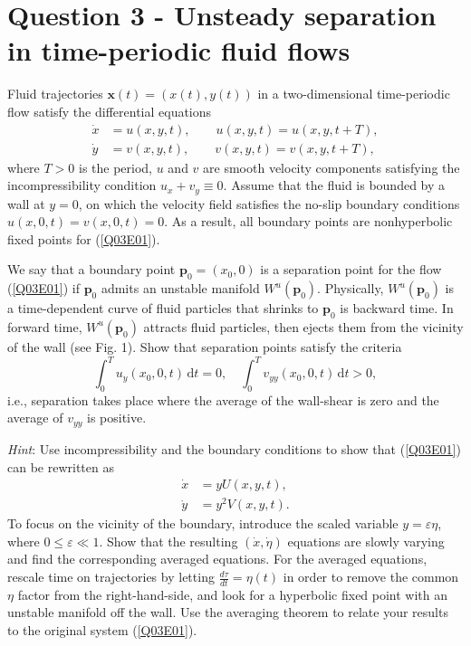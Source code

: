 \documentclass[twoside,10pt,a4paper]{article}
\begin{document}
\newpage

\section*{Question 3 - Unsteady separation in time-periodic fluid flows}
Fluid trajectories $\mathbf{x}(t) = (x(t),y(t))$ in a two-dimensional time-periodic flow satisfy the differential equations
\begin{equation}\label{Q03E01}
	\begin{aligned}
		\dot{x} &= u(x,y,t), \qquad u(x,y,t) = u(x,y,t+T), \\
		\dot{y} &= v(x,y,t), \qquad v(x,y,t) = v(x,y,t+T),
	\end{aligned}
\end{equation}
where $T>0$ is the period, $u$ and $v$ are smooth velocity components satisfying the incompressibility condition $u_x + v_y \equiv 0$. Assume that the fluid is bounded by a wall at $y=0$, on which the velocity field satisfies the no-slip boundary conditions $u(x,0,t) = v(x,0,t)=0$. As a result, all boundary points are nonhyperbolic fixed points for (\ref{Q03E01}).

We say that a boundary point $\mathbf{p}_0 = (x_0,0)$ is a separation point for the flow (\ref{Q03E01}) if $\mathbf{p}_0$ admits an unstable manifold $W^u(\mathbf{p}_0)$. Physically, $W^u(\mathbf{p}_0)$ is a time-dependent curve of fluid particles that shrinks to $\mathbf{p}_0$ is backward time. In forward time, $W^u(\mathbf{p}_0)$ attracts fluid particles, then ejects them from the vicinity of the wall (see Fig. 1). Show that separation points satisfy the criteria
\begin{equation*}
	\int_0^T u_y(x_0,0,t) \, \text{d}t = 0, \quad \int_0^T v_{yy}(x_0,0,t)\, \text{d}t > 0,
\end{equation*}
i.e., separation takes place where the average of the wall-shear is zero and the average of $v_{yy}$ is positive.

\textit{Hint}: Use incompressibility and the boundary conditions to show that (\ref{Q03E01}) can be rewritten as
\begin{align*}
	\dot{x} &= yU(x,y,t), \\
	\dot{y} &= y^2V(x,y,t).
\end{align*}
To focus on the vicinity of the boundary, introduce the scaled variable $y=\varepsilon \eta$, where $0 \leq \varepsilon \ll 1$. Show that the resulting $(\dot{x},\dot{\eta})$ equations are slowly varying and find the corresponding averaged equations. For the averaged equations, rescale time on trajectories by letting $\frac{d\tau}{dt} = \eta(t)$ in order to remove the common $\eta$ factor from the right-hand-side, and look for a hyperbolic fixed point with an unstable manifold off the wall. Use the averaging theorem to relate your results to the original system (\ref{Q03E01}).
\end{document}
